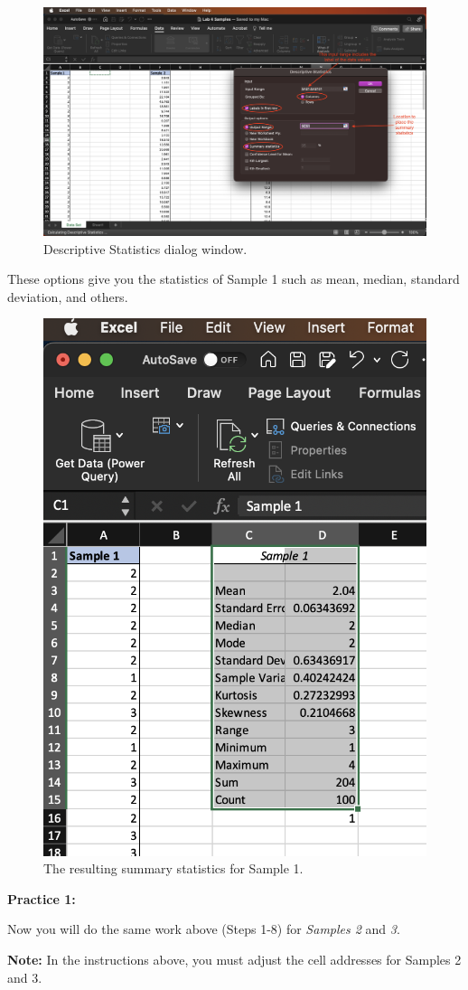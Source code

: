 \documentclass[
]{book}
\begin{document}
\begin{figure}

{\centering \includegraphics[width=0.8\linewidth]{descriptive-stats2} 

}

\caption{Descriptive Statistics dialog window.}\label{fig:descriptive-stats2}
\end{figure}

These options give you the statistics of Sample 1 such as mean, median, standard deviation, and others.

\begin{figure}

{\centering \includegraphics[width=0.4\linewidth]{summary-stats} 

}

\caption{The resulting summary statistics for Sample 1.}\label{fig:summary-stats}
\end{figure}

\textbf{Practice 1:}

Now you will do the same work above (Steps 1-8) for \emph{Samples 2} and \emph{3}.

\textbf{Note:} In the instructions above, you must adjust the cell addresses for Samples 2 and 3.
\end{document}
